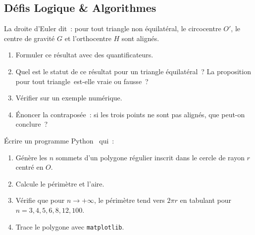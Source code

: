 \subsection*{D\'efis Logique \& Algorithmes}

\begin{challenge}
La droite d'Euler dit~: pour tout triangle non \'equilat\'eral,
le circocentre $O'$, le centre de gravité $G$ et l'orthocentre $H$ sont align\'es.
\begin{enumerate}
  \item Formuler ce r\'esultat avec des quantificateurs.
  \item Quel est le statut de ce r\'esultat pour un triangle \'equilat\'eral~?
        La proposition \og pour tout triangle\fg\ est-elle vraie ou fausse~?
  \item V\'erifier sur un exemple num\'erique.
  \item \'Enoncer la contrapos\'ee~: si les trois points ne sont pas align\'es,
        que peut-on conclure~?
\end{enumerate}
\end{challenge}

\begin{challenge}
\'Ecrire un programme Python \computer\ qui~:
\begin{enumerate}
  \item G\'en\`ere les $n$ sommets d'un polygone r\'egulier inscrit
        dans le cercle de rayon $r$ centr\'e en $O$.
  \item Calcule le p\'erim\`etre et l'aire.
  \item V\'erifie que pour $n\to+\infty$, le p\'erim\`etre tend vers $2\pi r$
        en tabulant pour $n=3,4,5,6,8,12,100$.
  \item Trace le polygone avec \texttt{matplotlib}.
\end{enumerate}
\end{challenge}



